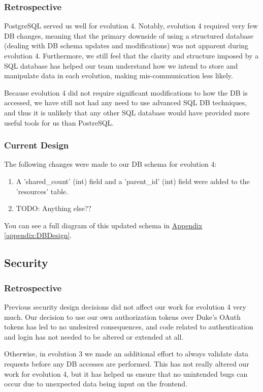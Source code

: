 \documentclass[12pt]{article}
\begin{document}
\subsubsection{Retrospective}
PostgreSQL served us well for evolution 4. Notably, evolution 4 required very few DB changes, meaning that the primary downside of using a structured database (dealing with DB schema updates and modifications) was not apparent during evolution 4. Furthermore, we still feel that the clarity and structure imposed by a SQL database has helped our team understand how we intend to store and manipulate data in each evolution, making mis-communication less likely. 

Because evolution 4 did not require significant modifications to how the DB is accessed, we have still not had any need to use advanced SQL DB techniques, and thus it is unlikely that any other SQL database would have provided more useful tools for us than PostreSQL. 


\subsubsection{Current Design}
The following changes were made to our DB schema for evolution 4:

\begin{enumerate}
    \item A 'shared_count' (int) field and a 'parent_id' (int) field were added to the 'resources' table. 
    \item TODO: Anything else?? 
\end{enumerate}

You can see a full diagram of this updated schema in  \hyperref[appendix:DBDesign]{Appendix \ref{appendix:DBDesign}}. 

\subsection{Security}
\subsubsection{Retrospective}
Previous security design decisions did not affect our work for evolution 4 very much. Our decision to use our own authorization tokens over Duke's OAuth tokens has led to no undesired consequences, and code related to authentication and login has not needed to be altered or extended at all. 

Otherwise, in evolution 3 we made an additional effort to always validate data requests before any DB accesses are performed. This has not really altered our work for evolution 4, but it has helped us ensure that no unintended bugs can occur due to unexpected data being input on the frontend. 
\end{document}
